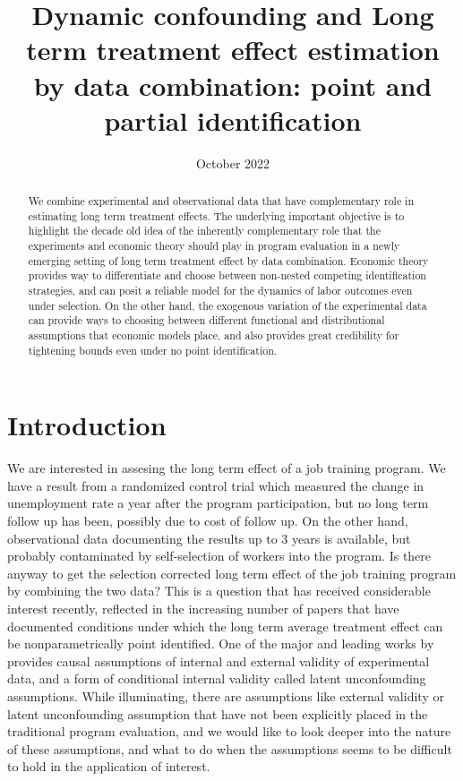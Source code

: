 \documentclass{article}
\title{Dynamic confounding and Long term treatment effect estimation by data combination: point and partial identification}
\date{October 2022}
\begin{document}
\maketitle

\begin{abstract}
    We combine experimental and observational data that have complementary role in estimating long term treatment effects. The underlying important objective is to highlight the decade old idea of the inherently complementary role that the experiments and economic theory should play in program evaluation in a newly emerging setting of long term treatment effect by data combination. Economic theory provides way to differentiate and choose between non-nested competing identification strategies, and can posit a reliable model for the dynamics of labor outcomes even under selection. On the other hand, the exogenous variation of the experimental data can provide ways to choosing between different functional and distributional assumptions that economic models place, and also provides great credibility for tightening bounds even under no point identification.
\end{abstract}

\part{Introduction}



We are interested in assesing the long term effect of a job training program. We have a result from a randomized control trial which measured the change in unemployment rate a year after the program participation, but no long term follow up has been, possibly due to cost of follow up. On the other hand, observational data documenting the results up to 3 years is available, but probably contaminated by self-selection of workers into the program. Is there anyway to get the selection corrected long term effect of the job training program by combining the two data? This is a question that has received considerable interest recently, reflected in the increasing number of papers that have documented conditions under which the long term average treatment effect can be nonparametrically point identified. One of the major and leading works by \cite{athey2020combining}  provides causal assumptions of internal and external validity of experimental data, and a form of conditional internal validity called latent unconfounding assumptions. While illuminating, there are assumptions like external validity or latent unconfounding assumption that have not been explicitly placed in the traditional program evaluation, and we would like to look deeper into the nature of these assumptions, and what to do when the assumptions seems to be difficult to hold in the application of interest. 
\end{document}
